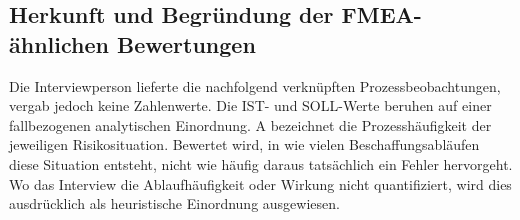 \documentclass[a4paper,12pt]{article}
\begin{document}
\clearpage
\subsection{Herkunft und Begründung der FMEA-ähnlichen Bewertungen}
\label{anhang:fmea-begruendung}
Die Interviewperson lieferte die nachfolgend verknüpften Prozessbeobachtungen, vergab jedoch keine Zahlenwerte. Die IST- und SOLL-Werte beruhen auf einer fallbezogenen analytischen Einordnung. A bezeichnet die Prozesshäufigkeit der jeweiligen Risikosituation. Bewertet wird, in wie vielen Beschaffungsabläufen diese Situation entsteht, nicht wie häufig daraus tatsächlich ein Fehler hervorgeht. Wo das Interview die Ablaufhäufigkeit oder Wirkung nicht quantifiziert, wird dies ausdrücklich als heuristische Einordnung ausgewiesen.

\footnotesize
\setlength{\LTpre}{8pt plus 2pt minus 2pt}
\setlength{\LTpost}{0pt}
\end{document}
